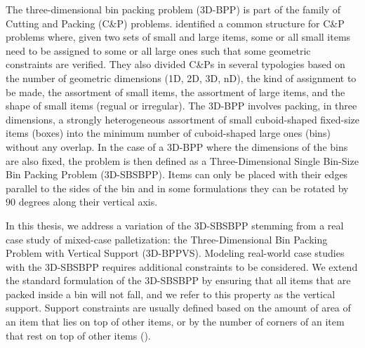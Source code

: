 The three-dimensional bin packing problem (3D-BPP) is part of the family of Cutting and Packing (C\&P) problems.
\cite{WASCHER20071109} identified a common structure for C\&P problems where, given two sets of small and large items, some or all small items need to be assigned to some or all large ones such that some geometric constraints are verified.
They also divided C\&Ps in several typologies based on the number of geometric dimensions (1D, 2D, 3D, nD), the kind of assignment to be made, the assortment of small items, the assortment of large items, and the shape of small items (regual or irregular).
The 3D-BPP involves packing, in three dimensions, a strongly heterogeneous assortment of small cuboid-shaped fixed-size items (boxes) into the minimum number of cuboid-shaped large ones (bins) without any overlap.
In the case of a 3D-BPP where the dimensions of the bins are also fixed, the problem is then defined as a Three-Dimensional Single Bin-Size Bin Packing Problem (3D-SBSBPP).
Items can only be placed with their edges parallel to the sides of the bin and in some formulations they can be rotated by $90$ degrees along their vertical axis.

In this thesis, we address a variation of the 3D-SBSBPP stemming from a real case study of mixed-case palletization: the Three-Dimensional Bin Packing Problem with Vertical Support (3D-BPPVS).
Modeling real-world case studies with the 3D-SBSBPP requires additional constraints to be considered. We extend the standard formulation of the 3D-SBSBPP by ensuring that all items that are packed inside a bin will not fall, and we refer to this property as the vertical support.
Support constraints are usually defined based on the amount of area of an item that lies on top of other items, or by the number of corners of an item that rest on top of other items (\cite{GZARA20201062, paquay2016mixed, kurpel2020exact}).

